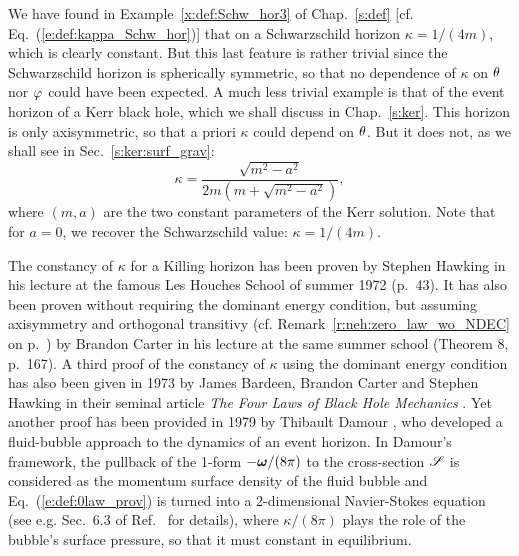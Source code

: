 \begin{example}
\label{x:neh:Schw_Kerr_kappa}
We have found in Example~\ref{x:def:Schw_hor3} of Chap.~\ref{s:def} [cf. Eq.~(\ref{e:def:kappa_Schw_hor})]
that on a Schwarzschild horizon $\kappa = 1/(4m)$,
which is clearly constant. But
this last feature is rather trivial since the Schwarzschild horizon is spherically
symmetric, so that no dependence of $\kappa$ on $\theta$ nor $\varphi$ could have been expected.
A much less trivial example is that of the event horizon of a Kerr black hole,
which we shall discuss in Chap.~\ref{s:ker}. This horizon is only axisymmetric,
so that a priori $\kappa$ could depend on $\theta$. But it does not, as we shall
see in Sec.~\ref{s:ker:surf_grav}:
\[
    \kappa = \frac{\sqrt{m^2 - a^2}}{2m(m + \sqrt{m^2-a^2})} ,
\]
where $(m,a)$ are the two constant parameters of the Kerr solution. Note that for $a=0$,
we recover the Schwarzschild value: $\kappa= 1/(4m)$.
\end{example}

\begin{hist}
The constancy of $\kappa$ for a Killing horizon has been proven by Stephen Hawking
in his lecture at the famous Les Houches School of summer 1972 \cite{Hawki73} (p.~43).
It has also been proven without requiring the dominant energy condition, but
assuming axisymmetry and orthogonal transitivy (cf. Remark~\ref{r:neh:zero_law_wo_NDEC} on p.~\pageref{r:neh:zero_law_wo_NDEC}) by Brandon Carter in his lecture at the same summer
school
\cite{Carte73b} (Theorem 8, p.~167).
A third proof of the constancy of $\kappa$ using the dominant energy condition
has also been given in 1973 by James Bardeen, Brandon Carter and
Stephen Hawking
in their seminal article \emph{The Four Laws of Black Hole Mechanics}
\cite{BardeCH73}. Yet another proof has been provided in 1979 by Thibault Damour
\cite{Damou79,Damou82}, who developed a fluid-bubble approach to the dynamics of an event horizon.
In Damour's framework, the pullback of the 1-form  $-\bm{\omega}/(8\pi)$ to the cross-section
$\mathscr{S}$ is considered as the momentum surface density of the fluid bubble and Eq.~(\ref{e:def:0law_prov})
is turned into a 2-dimensional Navier-Stokes equation (see e.g. Sec.~6.3 of Ref.~\cite{GourgJ06} for details), where $\kappa/(8\pi)$ plays the role of the
bubble's surface pressure, so that it must constant in equilibrium.
\end{hist}

